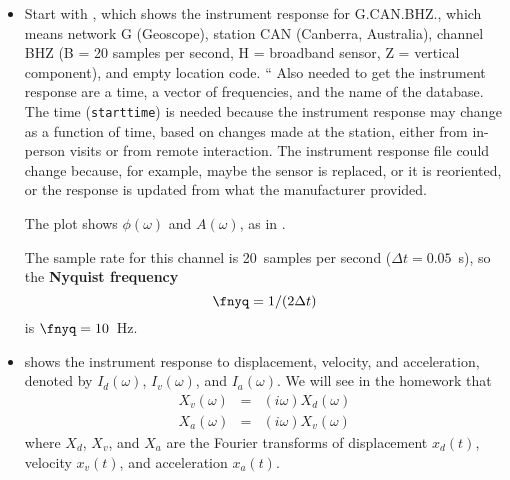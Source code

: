 \documentclass[11pt,titlepage,fleqn]{article}
\begin{document}
\begin{itemize}
\item Start with , which shows the instrument response for G.CAN.BHZ., which means network G (Geoscope), station CAN (Canberra, Australia), channel BHZ (B = 20 samples per second, H = broadband sensor, Z = vertical component), and empty location code.
%
%
``%
Also needed to get the instrument response are a time, a vector of frequencies, and the name of the database. The time (\verb+starttime+) is needed because the instrument response may change as a function of time, based on changes made at the station, either from in-person visits or from remote interaction. The instrument response file could change because, for example, maybe the sensor is replaced, or it is reoriented, or the response is updated from what the manufacturer provided.

The plot shows $\phi(\omega)$ and $A(\omega)$, as in .

The sample rate for this channel is 20~samples per second ($\Delta t = 0.05$~s), so the {\bf Nyquist frequency}
%
\begin{equation}
\fnyq = 1/(2\Delta t)
\end{equation}
%
is $\fnyq = 10$~Hz.


\item {} shows the instrument response to displacement, velocity, and acceleration, denoted by $I_d(\omega)$, $I_v(\omega)$, and $I_a(\omega)$. We will see in the homework that 
%
\begin{eqnarray*}
X_v(\omega) &=& (i\omega) X_d(\omega)
\\
X_a(\omega) &=& (i\omega) X_v(\omega)
\end{eqnarray*}
%
where $X_d$, $X_v$, and $X_a$ are the Fourier transforms of displacement $x_d(t)$, velocity $x_v(t)$, and acceleration $x_a(t)$.


\end{itemize}
\end{document}

